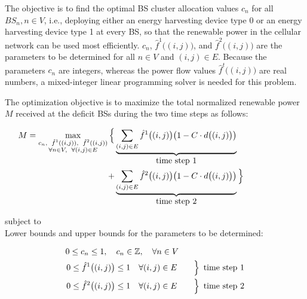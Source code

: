 The objective is to find the optimal BS cluster allocation values $c_n$ for all $BS_n, n \in V$, i.e., deploying either an energy harvesting device type 0 or an energy
harvesting device type 1 at every BS, so that the renewable power in the cellular network can be used most efficiently. $c_n$, $\hat{f}^1\big((i,j)\big)$, and $\hat{f}^2\big((i,j)\big)$ are the parameters to be determined for all $n\in V$ and $(i,j)\in E$. Because the parameters $c_n$ are integers, whereas the power flow values $\hat{f}^t\big((i,j)\big)$ are real numbers, a mixed-integer linear programming solver is needed for this problem. 


The optimization objective is to maximize the total normalized renewable power $M$ received at the deficit BSs during the two time steps as follows:
 


\begin{equation}\label{objective_function}
\begin{aligned}
M=\max_{\substack{c_n,\enskip \hat{f}^1((i,j)), \enskip \hat{f}^2((i,j))\\ \forall n\in V, \enskip \forall(i,j)\in E}} \Big\{&\underbrace{\sum_{(i,j)\in E }\hat{f}^{1}\big((i,j)\big)\big(1-C \cdot d\big((i,j)\big)\big)}_{\text{\normalsize{time step 1}}}\\
+&\underbrace{\sum_{(i,j)\in E }\hat{f}^{2}\big((i,j)\big)\big(1-C \cdot d\big((i,j)\big)\big)}_{\text{\normalsize{time step 2}}}\Big\}\hphantom{safljlllflasd}
\end{aligned}
\end{equation}






\noindent
subject to\\




\noindent
Lower bounds and upper bounds for the parameters to be determined:



\begin{equation}\label{ineq1}
\begin{aligned}
&0 \leq c_n \leq 1,  \quad c_n \in \mathbb{Z}, \quad \forall n\in V\\
 &{\left.0 \leq \hat{f}^1\big((i,j)\big) \leq 1 \quad \forall (i,j)\in E \quad \quad \right\rbrace}\enskip\text{time step 1}\\
 &{\left.0 \leq \hat{f}^2\big((i,j)\big) \leq 1 \quad \forall (i,j)\in E \quad \quad \right\rbrace}\enskip\text{time step 2}
\end{aligned}
\end{equation}




